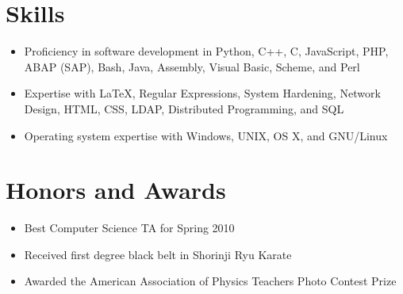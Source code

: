 \documentclass{resume}
\begin{document}

\section{Skills}
\begin{itemize}
	\item Proficiency in software development in Python, C++, C, JavaScript, PHP, ABAP (SAP), Bash, Java, Assembly, Visual Basic, Scheme, and Perl
	\item Expertise with \LaTeX, Regular Expressions, System Hardening, Network Design, HTML, CSS, LDAP, Distributed Programming, and SQL
	\item Operating system expertise with Windows, UNIX, OS X, and GNU/Linux
\end{itemize}

\section{Honors and Awards}
\begin{itemize}
	\item Best Computer Science TA for Spring 2010
	\item Received first degree black belt in Shorinji Ryu Karate
	\item Awarded the American Association of Physics Teachers Photo Contest Prize
\end{itemize}
\end{document}
